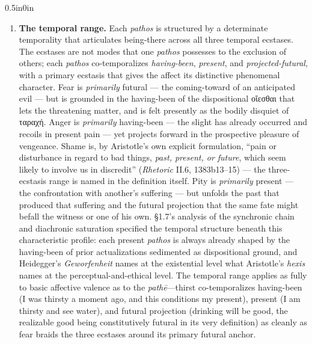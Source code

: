 \documentclass{article}
\newcommand{\gk}[1]{{\greekfont #1}}
\begin{document}
\begin{adjustwidth}{0.5in}{0in}
\begin{enumerate}
        \item \textbf{The temporal range.} Each \textit{pathos} is structured by a determinate temporality that articulates being-there across all three temporal ecstases. The ecstases are not modes that one \textit{pathos} possesses to the exclusion of others; each \textit{pathos} co-temporalizes \textit{having-been}, \textit{present}, and \textit{projected-futural}, with a primary ecstasis that gives the affect its distinctive phenomenal character. Fear is \textit{primarily} futural --- the coming-toward of an anticipated evil --- but is grounded in the having-been of the dispositional \gk{οἴεσθαι} that lets the threatening matter, and is felt presently as the bodily disquiet of \gk{ταραχή}. Anger is \textit{primarily} having-been --- the slight has already occurred and recoils in present pain --- yet projects forward in the prospective pleasure of vengeance. Shame is, by Aristotle's own explicit formulation, ``pain or disturbance in regard to bad things, \textit{past, present, or future}, which seem likely to involve us in discredit'' (\textit{Rhetoric} II.6, 1383b13--15) --- the three-ecstasis range is named in the definition itself. Pity is \textit{primarily} present --- the confrontation with another's suffering --- but unfolds the past that produced that suffering and the futural projection that the same fate might befall the witness or one of his own. \S1.7's analysis of the synchronic chain and diachronic saturation specified the temporal structure beneath this characteristic profile: each present \textit{pathos} is always already shaped by the having-been of prior actualizations sedimented as dispositional ground, and Heidegger's \textit{Geworfenheit} names at the existential level what Aristotle's \textit{hexis} names at the perceptual-and-ethical level. The temporal range applies as fully to basic affective valence as to the \textit{pathē}---thirst co-temporalizes having-been (I was thirsty a moment ago, and this conditions my present), present (I am thirsty and see water), and futural projection (drinking will be good, the realizable good being constitutively futural in its very definition) as cleanly as fear braids the three ecstases around its primary futural anchor. 
        

\end{enumerate}
\end{adjustwidth}
\end{document}
